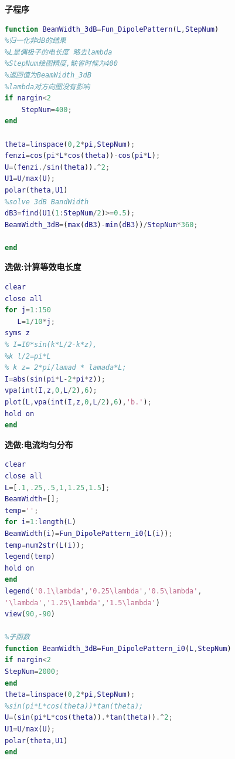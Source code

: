 \noindent \textbf{子程序}
\begin{lstlisting}[language={matlab},keywordstyle=\color{blue!70},commentstyle=\color{red!50!green!50!blue!50},frame=shadowbox, rulesepcolor=\color{red!20!green!20!blue!20}] 
function BeamWidth_3dB=Fun_DipolePattern(L,StepNum)
%归一化非dB的结果
%L是偶极子的电长度 略去lambda
%StepNum绘图精度,缺省时候为400
%返回值为BeamWidth_3dB
%lambda对方向图没有影响
if nargin<2
    StepNum=400;
end
    
theta=linspace(0,2*pi,StepNum);
fenzi=cos(pi*L*cos(theta))-cos(pi*L);
U=(fenzi./sin(theta)).^2;
U1=U/max(U);
polar(theta,U1)
%solve 3dB BandWidth
dB3=find(U1(1:StepNum/2)>=0.5);
BeamWidth_3dB=(max(dB3)-min(dB3))/StepNum*360;

end
\end{lstlisting}
\noindent \textbf{选做:计算等效电长度}
\begin{lstlisting}[language={matlab},keywordstyle=\color{blue!70},commentstyle=\color{red!50!green!50!blue!50},frame=shadowbox, rulesepcolor=\color{red!20!green!20!blue!20}] 
%计算电长度
clear
close all
for j=1:150
   L=1/10*j;
syms z
% I=I0*sin(k*L/2-k*z), 
%k l/2=pi*L 
% k z= 2*pi/lamad * lamada*L;
I=abs(sin(pi*L-2*pi*z));
vpa(int(I,z,0,L/2),6);
plot(L,vpa(int(I,z,0,L/2),6),'b.');
hold on
end
\end{lstlisting}
\noindent \textbf{选做:电流均匀分布}
\begin{lstlisting}[language={matlab},keywordstyle=\color{blue!70},commentstyle=\color{red!50!green!50!blue!50},frame=shadowbox, rulesepcolor=\color{red!20!green!20!blue!20}] 
%主程序
clear
close all
L=[.1,.25,.5,1,1.25,1.5];
BeamWidth=[];
temp='';
for i=1:length(L)
BeamWidth(i)=Fun_DipolePattern_i0(L(i));
temp=num2str(L(i));
legend(temp)   
hold on 
end
legend('0.1\lambda','0.25\lambda','0.5\lambda',
'\lambda','1.25\lambda','1.5\lambda')
view(90,-90)

%子函数
function BeamWidth_3dB=Fun_DipolePattern_i0(L,StepNum)
if nargin<2
StepNum=2000;
end
theta=linspace(0,2*pi,StepNum);
%sin(pi*L*cos(theta))*tan(theta);
U=(sin(pi*L*cos(theta)).*tan(theta)).^2;
U1=U/max(U);
polar(theta,U1)
end


\end{lstlisting}